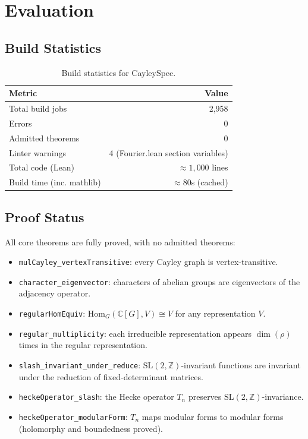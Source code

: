 \documentclass[11pt]{article}
\theoremstyle{plain}
\theoremstyle{definition}
\theoremstyle{remark}
\begin{document}
\section{Evaluation}
\label{sec:evaluation}

\subsection{Build Statistics}

\begin{table}[H]
\centering
\begin{tabular}{lr}
\toprule
\textbf{Metric} & \textbf{Value} \\
\midrule
Total build jobs & 2,958 \\
Errors & 0 \\
Admitted theorems & 0 \\
Linter warnings & 4 (Fourier.lean section variables) \\
Total code (Lean) & $\approx 1,\!000$ lines \\
Build time (inc. mathlib) & $\approx 80$s (cached) \\
\bottomrule
\end{tabular}
\caption{Build statistics for CayleySpec.}
\end{table}

\subsection{Proof Status}

All core theorems are fully proved, with no admitted theorems:

\begin{itemize}
  \item \texttt{mulCayley\_vertexTransitive}: every Cayley graph is vertex-transitive.
  \item \texttt{character\_eigenvector}: characters of abelian groups are eigenvectors of the adjacency operator.
  \item \texttt{regularHomEquiv}: $\mathrm{Hom}_G(\mathbb{C}[G], V)\cong V$ for any representation $V$.
  \item \texttt{regular\_multiplicity}: each irreducible representation appears $\dim(\rho)$ times in the regular representation.
  \item \texttt{slash\_invariant\_under\_reduce}: $\mathrm{SL}(2,\mathbb{Z})$-invariant functions are invariant under the reduction of fixed-determinant matrices.
  \item \texttt{heckeOperator\_slash}: the Hecke operator $T_n$ preserves $\mathrm{SL}(2,\mathbb{Z})$-invariance.
  \item \texttt{heckeOperator\_modularForm}: $T_n$ maps modular forms to modular forms (holomorphy and boundedness proved).
\end{itemize}
\end{document}
